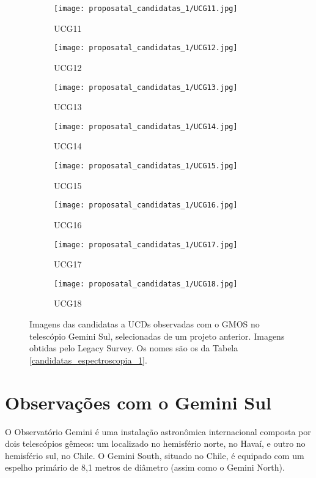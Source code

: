 \begin{figure}[!ht]
\begin{subfigure}[b]{0.22\textwidth}
        \texttt{[image: proposatal\_candidatas\_1/UCG11.jpg]}
        \caption{UCG11}
    \end{subfigure}
    \begin{subfigure}[b]{0.22\textwidth}
        \texttt{[image: proposatal\_candidatas\_1/UCG12.jpg]}
        \caption{UCG12}
    \end{subfigure}
    \begin{subfigure}[b]{0.22\textwidth}
        \texttt{[image: proposatal\_candidatas\_1/UCG13.jpg]}
        \caption{UCG13}
    \end{subfigure}
    \begin{subfigure}[b]{0.22\textwidth}
        \texttt{[image: proposatal\_candidatas\_1/UCG14.jpg]}
        \caption{UCG14}
    \end{subfigure}
    \begin{subfigure}[b]{0.22\textwidth}
        \texttt{[image: proposatal\_candidatas\_1/UCG15.jpg]}
        \caption{UCG15}
    \end{subfigure}
    \begin{subfigure}[b]{0.22\textwidth}
        \texttt{[image: proposatal\_candidatas\_1/UCG16.jpg]}
        \caption{UCG16}
    \end{subfigure}
    \begin{subfigure}[b]{0.22\textwidth}
        \texttt{[image: proposatal\_candidatas\_1/UCG17.jpg]}
        \caption{UCG17}
    \end{subfigure}
    \begin{subfigure}[b]{0.22\textwidth}
        \texttt{[image: proposatal\_candidatas\_1/UCG18.jpg]}
        \caption{UCG18}
    \end{subfigure}
    \caption{Imagens das candidatas a UCDs observadas com o GMOS no telescópio Gemini Sul, selecionadas de um projeto anterior. Imagens obtidas pelo Legacy Survey. Os nomes são os da Tabela \ref{candidatas_espectroscopia_1}.}
    \label{candidatas_espectroscopia_1_img}
\end{figure}

\section{Observações com o Gemini Sul}\label{sec:observacoes_gemini}
O Observatório Gemini é uma instalação astronômica internacional composta por dois telescópios gêmeos: um localizado no hemisfério norte, no Havaí, e outro no hemisfério sul, no Chile. O Gemini South, situado no Chile, é equipado com um espelho primário de 8,1 metros de diâmetro (assim como o Gemini North).

